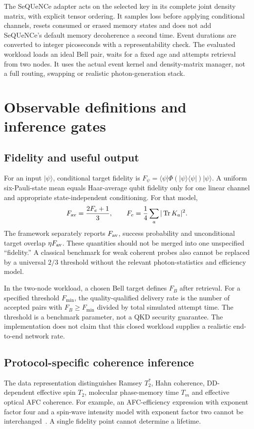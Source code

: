 \documentclass[11pt,a4paper]{article}
\newcommand{\Tr}{\operatorname{Tr}}
\newcommand{\ket}[1]{\lvert #1\rangle}
\newcommand{\bra}[1]{\langle #1\rvert}
\begin{document}
The SeQUeNCe adapter acts on the selected key in its complete joint density matrix, with explicit tensor ordering. It samples loss before applying conditional channels, resets consumed or erased memory states and does not add SeQUeNCe's default memory decoherence a second time. Event durations are converted to integer picoseconds with a representability check. The evaluated workload loads an ideal Bell pair, waits for a fixed age and attempts retrieval from two nodes. It uses the actual event kernel and density-matrix manager, not a full routing, swapping or realistic photon-generation stack.

\section{Observable definitions and inference gates}
\label{sec:inference}
\subsection{Fidelity and useful output}
For an input $\ket\psi$, conditional target fidelity is $F_\psi=\bra\psi\Phi(\ket\psi\bra\psi)\ket\psi$. A uniform six-Pauli-state mean equals Haar-average qubit fidelity only for one linear channel and appropriate state-independent conditioning. For that model,
\begin{equation}
F_{\rm av}=\frac{2F_e+1}{3},\qquad
F_e=\frac14\sum_a|\Tr K_a|^2.
\end{equation}
The framework separately reports $F_{\rm av}$, success probability and unconditional target overlap $\eta F_{\rm av}$. These quantities should not be merged into one unspecified ``fidelity.'' A classical benchmark for weak coherent probes also cannot be replaced by a universal $2/3$ threshold without the relevant photon-statistics and efficiency model.

In the two-node workload, a chosen Bell target defines $F_B$ after retrieval. For a specified threshold $F_{\min}$, the quality-qualified delivery rate is the number of accepted pairs with $F_B\geq F_{\min}$ divided by total simulated attempt time. The threshold is a benchmark parameter, not a QKD security guarantee. The implementation does not claim that this closed workload supplies a realistic end-to-end network rate.

\subsection{Protocol-specific coherence inference}
The data representation distinguishes Ramsey $T_2^*$, Hahn coherence, DD-dependent effective spin $T_2$, molecular phase-memory time $T_m$ and effective optical AFC coherence. For example, an AFC-efficiency expression with exponent factor four and a spin-wave intensity model with exponent factor two cannot be interchanged~\cite{ortu}. A single fidelity point cannot determine a lifetime.
\end{document}
